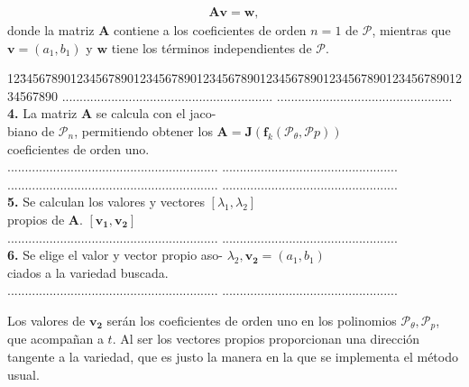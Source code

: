 \begin{eqnarray}
\mathbf{A}\mathbf{v}=\mathbf{w},
\label{lineal A}
\end{eqnarray}
donde la matriz $\mathbf{A}$ contiene a los coeficientes de  orden $n=1$  de $\mathcal{P}$, mientras que $\textbf{v}=(a_{1},b_{1})$ y $\textbf{w}$ tiene los términos independientes de $\mathcal{P}$. 
\begin{center}

  
\begin{tabbing}
12\=34567890123456789012345678901234567890123456\=7890123456789012345678901234567890\kill%
\>............................................................  \>..................................................\\
\>\textbf{4.} La matriz $\mathbf{A}$ se calcula con el jaco- \>  \\
\>biano de $\mathcal{P}_{n}$, permitiendo obtener los \> $\mathbf{A}=\mathbf{J}(\mathbf{f}_{k}(\mathcal{P}_{\theta},\mathcal{P}{p}))$  \\
\>coeficientes de orden uno.   \> \\

\>............................................................  \>..................................................\\
\>............................................................  \>..................................................\\
\>\textbf{5.} Se calculan los valores y vectores  \> $[\lambda_{1},\lambda_{2}]$\\
\>propios de $\mathbf{A}$.  \> $[\mathbf{v_{1}},\mathbf{v_{2}}]$\\
\>............................................................  \>..................................................\\
\>\textbf{6.} Se elige el valor y vector propio aso-\> $\lambda_{2},\mathbf{v_{2}}=(a_{1},b_{1})$\\
\>ciados a la variedad buscada. \> \\

\>............................................................  \>..................................................\\
\end{tabbing}
\end{center}
Los valores de $\mathbf{v_{2}}$ serán los coeficientes de orden uno en los polinomios $\mathcal{P}_{\theta},\mathcal{P}_{p}$, que acompañan a $t$. Al ser los vectores propios proporcionan una dirección tangente a la variedad, que es justo la manera en la que se implementa el método usual.\\

